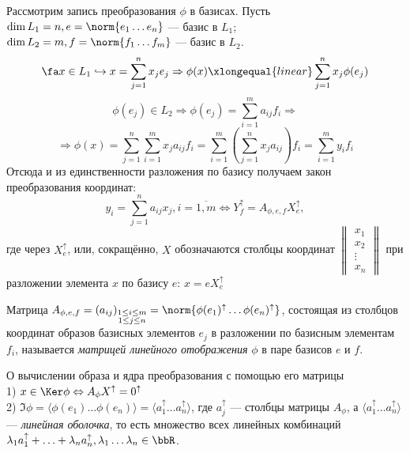   Рассмотрим запись преобразования $\phi$  в базисах. Пусть $\dim L_1 = n, e=\norm{e_1 \ldots e_n}$ --- базис в $L_1$; $\dim L_2 = m, f=\norm{f_1 \ldots f_m}$ --- базис в $L_2$.
  \begin{equation*}
  \fa x \in L_1 \hookrightarrow x=\sum_{j=1}^n x_je_j \Rightarrow \phi(x)\xlongequal{linear}\sum_{j=1}^n x_j\phi(e_j) 
  \end{equation*}
  \begin{equation*}
  \phi(e_j) \in L_2 \Rightarrow \phi(e_j)=\sum_{i=1}^m a_{ij}f_i \Rightarrow 
  \end{equation*}
  \begin{equation*}
  \Rightarrow \phi(x)=\sum_{j=1}^n\sum_{i=1}^m x_ja_{ij}f_i = \sum_{i=1}^m(\sum_{j=1}^n x_ja_{ij})f_i = \sum_{i=1}^m y_if_i
  \end{equation*}
  Отсюда и из единственности разложения по базису получаем закон преобразования координат:
  \begin{equation}
  y_i=\sum_{j=1}^n a_{ij}x_j, i=\overline{1,m} \Leftrightarrow Y_f^\uparrow=A_{\phi,e,f}X_e^\uparrow,
  \end{equation}
  где через $X_e^\uparrow$, или, сокращённо, $X$ обозначаются столбцы координат $\begin{Vmatrix}
  x_1 \\ x_2 \\ \vdots \\ x_n
  \end{Vmatrix}$ при разложении элемента $x$ по базису $e$: $x=e X_e^\uparrow$
  \begin{defn}
  Матрица $A_{\phi,e,f}=(a_{ij})_{\substack{ 1\le i\le m \\ 1\le j\le n }}=\norm{\phi(e_1)^\uparrow \ldots \phi(e_n)^\uparrow}$, состоящая из столбцов координат образов базисных элементов $e_j$ в разложении по базисным элементам $f_i$, называется \textit{матрицей линейного отображения} $\phi$ в паре базисов $e$ и $f$.
  \end{defn}
  \begin{stt}\label{22.1.KerIm} {О вычислении образа и ядра преобразования с помощью его матрицы} $ $\\
  1) $x \in \Ker\phi \Leftrightarrow A_\phi X^\uparrow=0^\uparrow$ \\
  2) $\Im\phi=\langle\phi(e_1) \ldots \phi(e_n)\rangle=\langle a_1^\uparrow \ldots a_n^\uparrow\rangle$, где $a_j^\uparrow$ --- столбцы матрицы $A_\phi$, а $\langle a_1^\uparrow \ldots a_n^\uparrow\rangle$ --- \textit{линейная оболочка}, то есть множество всех линейных комбинаций $\lambda_1 a_1^\uparrow + \ldots + \lambda_n a_n^\uparrow, \lambda_1\ldots\lambda_n \in \bbR$.
  \end{stt}
